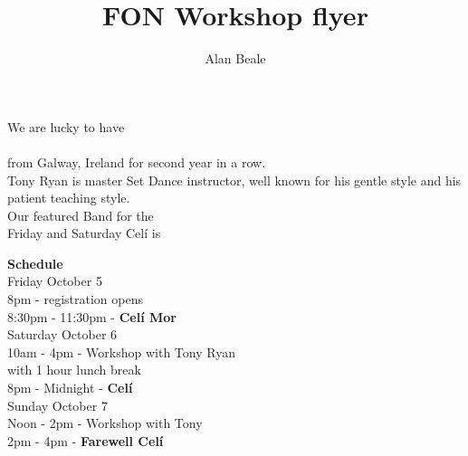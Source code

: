 \documentclass[12pt,letterpaper]{leaflet}
\title{FON Workshop flyer}
\author{Alan Beale}
\date{}
\begin{document}

\pagebreak
\begin{center}
We are lucky to have \\
\\
\vspace*{1em} from Galway, Ireland for second year in a row.\\
Tony Ryan is master Set Dance instructor, well known for his gentle
style and his patient teaching style. \\

\vspace*{4em}
Our featured Band for the \\Friday and Saturday Cel\'{i} is \\
\end{center}
\pagebreak

\begin{flushleft}
{\large \textbf{Schedule}}\\ 
\vspace*{2em}
Friday October 5\\
\hspace*{6em}  8pm  - registration opens\\
\hspace*{6em}  8:30pm  - 11:30pm  - \textbf{Cel\'{i} Mor}\\

Saturday October 6\\
\hspace*{6em}  10am - 4pm  - Workshop with Tony Ryan\\
\hspace*{6em}  {\small with 1 hour lunch break}\\

\hspace*{6em}  8pm - Midnight - \textbf{Cel\'{i}}\\

Sunday October 7\\
\hspace*{6em}  Noon - 2pm  - Workshop  with Tony \\

 \hspace*{6em} 2pm - 4pm - \textbf{Farewell Cel\'{i}}\\
\end{flushleft}
\end{document}
